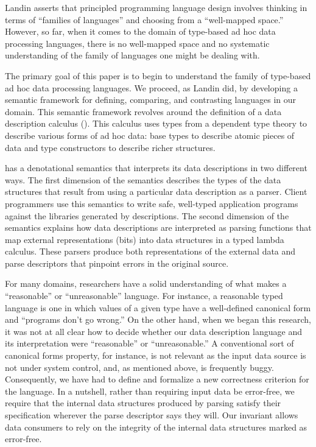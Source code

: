 Landin asserts that principled programming language design
involves thinking in terms of ``families of languages'' and
choosing from a ``well-mapped space.''  However, so far,
when it comes to the domain of type-based ad hoc data processing languages, 
there is no well-mapped space and no systematic understanding
of the family of languages one might be dealing with.

The primary goal of this paper is to begin to understand the
family of type-based ad hoc data processing languages.  We proceed,
as Landin did, by developing a semantic
framework for defining, comparing, and contrasting languages
in our domain.  This semantic framework revolves around the
definition of a data description calculus (\ddc{}).  
This calculus uses types from a dependent type theory to describe
various forms of ad hoc data:
base types to describe atomic pieces of data and
type constructors to describe richer structures.

\ddc{} has a denotational semantics
that interprets its data descriptions in two different
ways.  The first dimension of the semantics describes the
types of the data structures that result from using a particular
data description as a parser.  Client programmers use this semantics to
write safe, well-typed application programs against the libraries
generated by \ddc{} descriptions.  The second dimension of the semantics
explains how data descriptions are
interpreted as parsing functions that map external representations (bits)
into data structures in a typed lambda calculus.  These parsers produce both 
representations of the external data and
parse descriptors that pinpoint errors in the original source.



For many domains, researchers have a solid understanding of
what makes a ``reasonable'' or ``unreasonable'' language.  For instance,
a reasonable typed language is one in which values of a given type
have a well-defined canonical form and ``programs don't go wrong.''
On the other hand, when we began this research, it
was not at all clear
how to decide whether our data description language and
its interpretation were ``reasonable'' or ``unreasonable.''  
A conventional sort
of canonical forms property, for instance, 
is not relevant as the input data source
is not under system control, and, as
mentioned above, is frequently buggy.  Consequently,
we have had to define and formalize a new correctness criterion 
for the language. 
In a nutshell, rather than requiring input data be error-free, we require
that the internal data structures produced by parsing 
satisfy their specification wherever the parse descriptor says they
will.  Our invariant allows
data consumers to rely on the integrity of the internal data structures
marked as error-free. 

